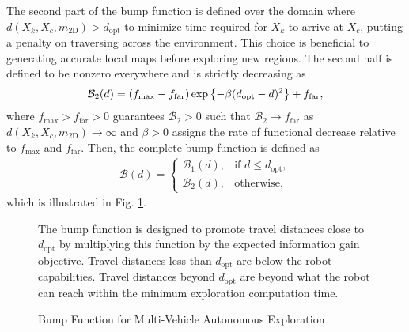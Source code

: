 The second part of the bump function is defined over the domain where \\$d(X_k,X_c,m_\text{2D})>d_\text{opt}$ to minimize time required for $X_k$ to arrive at $X_c$, putting a penalty on traversing across the environment. This choice is beneficial to generating accurate local maps before exploring new regions. The second half is defined to be nonzero everywhere and is strictly decreasing as 
\begin{align}
\label{eqn:BumpFunDecreasing}
\mathcal B_2(d)=(f_\text{max}-f_\text{far})\exp\left\{ -\beta(d_\text{opt}-d)^2 \right\}+f_\text{far},
\end{align}
where $f_\text{max}>f_\text{far}>0$ guarantees $\mathcal B_2>0$ such that $\mathcal B_2\rightarrow f_\text{far}$ as $d(X_k,X_c,m_\text{2D})\rightarrow\infty$ and $\beta>0$ assigns the rate of functional decrease relative to $f_\text{max}$ and $f_\text{far}$. Then, the complete bump function is defined as
\begin{align}
\label{eqn:BumpFun}
\mathcal B(d)=
\begin{cases}
    \mathcal B_1(d),		& \text{if }d\leq d_\text{opt},\\
    \mathcal B_2(d),         & \text{otherwise},
\end{cases}
\end{align}
which is illustrated in Fig. \ref{fig:nonzeroBumpFun}. %

	\begin{figure}
		\caption{Bump Function for Multi-Vehicle Autonomous Exploration}
		\medskip
		\small
		The bump function is designed to promote travel distances close to $d_\text{opt}$ by multiplying this function by the expected information gain objective. Travel distances less than $d_\text{opt}$ are below the robot capabilities. Travel distances beyond $d_\text{opt}$ are beyond what the robot can reach within the minimum exploration computation time.
		\label{fig:nonzeroBumpFun}
	\end{figure}
	
